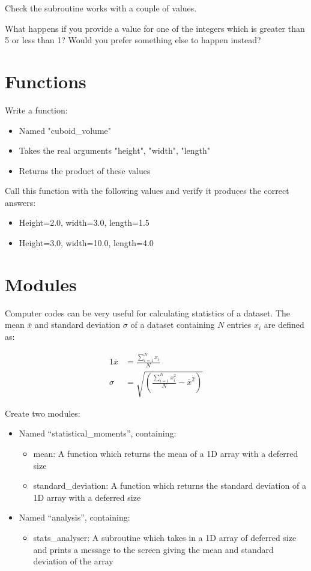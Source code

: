 \documentclass[11pt,a4paper]{article}
\begin{document}
Check the subroutine works with a couple of values.

What happens if you provide a value for one of the integers which is greater than 5 or less than 1? Would you prefer something else to happen instead?

\section{Functions}
Write a function:
\begin{itemize}
    \item Named "cuboid\_volume"
    \item Takes the real arguments "height", "width", "length"
    \item Returns the product of these values
\end {itemize}
Call this function with the following values and verify it produces the correct answers:
\begin{itemize}
    \item Height=2.0, width=3.0, length=1.5
    \item Height=3.0, width=10.0, length=4.0
\end {itemize}

\section{Modules}
Computer codes can be very useful for calculating statistics of a dataset. The mean $\bar{x}$ and standard deviation $\sigma$ of a dataset containing $N$ entries $x_{i}$ are defined as:

\begin{alignat}{1}
    \bar{x} & = \frac{\sum\limits_{i=1}^{N} x_{i}}{N} \\
    \sigma &= \sqrt{\left(\frac{\sum\limits_{i=1}^{N} x_{i}^{2}}{N}-\bar{x}^{2}\right)}
\end{alignat}

Create two modules:
\begin{itemize}
    \item Named ``statistical\_moments'', containing:
    \begin{itemize}
        \item mean: A function which returns the mean of a 1D array with a deferred size
        \item standard\_deviation: A function which returns the standard deviation of a 1D array with a deferred size
    \end{itemize}
    \item Named ``analysis'', containing:
    \begin{itemize}
        \item stats\_analyser: A subroutine which takes in a 1D array of deferred size and prints a message to the screen giving the mean and standard deviation of the array
    \end{itemize}
\end{itemize}
\end{document}
